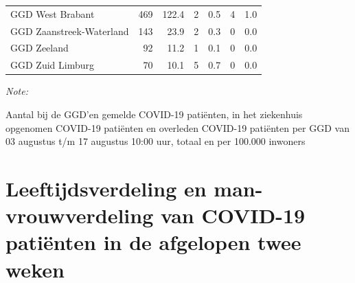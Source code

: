 \documentclass[
  english,
  man,floatsintext]{apa6}
\begin{document}
\begin{table}[H]
\begin{threeparttable}
\begin{tabular}{lrrrrrr}
GGD West Brabant & 469 & 122.4 & 2 & 0.5 & 4 & 1.0\\
GGD Zaanstreek-Waterland & 143 & 23.9 & 2 & 0.3 & 0 & 0.0\\
GGD Zeeland & 92 & 11.2 & 1 & 0.1 & 0 & 0.0\\
GGD Zuid Limburg & 70 & 10.1 & 5 & 0.7 & 0 & 0.0\\
\bottomrule
\end{tabular}
\begin{tablenotes}
\item \textit{Note: } 
\item Aantal bij de GGD’en gemelde COVID-19 patiënten, in het ziekenhuis opgenomen COVID-19 patiënten en overleden COVID-19 patiënten per GGD van 03 augustus t/m 17 augustus 10:00 uur, totaal en per 100.000 inwoners
\end{tablenotes}
\end{threeparttable}
\endgroup{}
\end{table}

\newpage

\hypertarget{leeftijdsverdeling-en-man-vrouwverdeling-van-covid-19-patiuxebnten-in-de-afgelopen-twee-weken}{%
\section{Leeftijdsverdeling en man-vrouwverdeling van COVID-19 patiënten in de afgelopen twee weken}\label{leeftijdsverdeling-en-man-vrouwverdeling-van-covid-19-patiuxebnten-in-de-afgelopen-twee-weken}}
\end{document}
